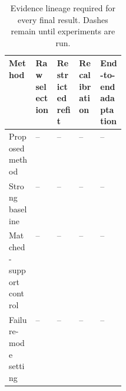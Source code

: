 \begin{table}[t]
\centering
\caption{Evidence lineage required for every final result. Dashes remain until experiments are run.}
\label{tab:evidence-lineage}
\small
\begin{tabularx}{0.96\linewidth}{@{}p{0.23\linewidth}XXXX@{}}
\toprule
\textbf{Method} & \textbf{Raw selection} & \textbf{Restricted refit} & \textbf{Recalibration} & \textbf{End-to-end adaptation} \\
\midrule
Proposed method & -- & -- & -- & -- \\
Strong baseline & -- & -- & -- & -- \\
Matched-support control & -- & -- & -- & -- \\
Failure-mode setting & -- & -- & -- & -- \\
\bottomrule
\end{tabularx}
\end{table}
